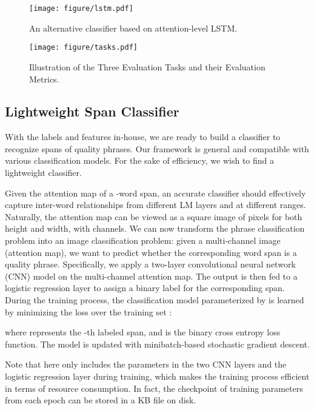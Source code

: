 \documentclass[sigconf]{acmart}
\begin{document}
\begin{figure}[t]
    \centering
    \texttt{[image: figure/lstm.pdf]}
    \caption{An alternative classifier based on attention-level LSTM.}
    \label{fig:lstm}
\end{figure}

\begin{figure*}[t]
    \centering
    \texttt{[image: figure/tasks.pdf]}
    \caption{
    Illustration of the Three Evaluation Tasks and their Evaluation Metrics.
    }\label{fig:tasks}\vspace{-3mm}
\end{figure*}


\subsection{Lightweight Span Classifier}
\label{sec:classifier}

With the labels and features in-house, we are ready to build a classifier to recognize spans of quality phrases. 
Our framework is general and 
compatible with various classification models.
For the sake of efficiency, we wish to find a lightweight classifier. 

Given the attention map of a -word span, an accurate classifier should effectively capture inter-word relationships from different LM layers and at different ranges.
Naturally, the attention map can be viewed as a square image of  pixels for both height and width, with  channels.
We can now transform the phrase classification problem into an image classification problem: given a multi-channel image (attention map), we want to predict whether the corresponding word span is a quality phrase.
Specifically, we apply a two-layer convolutional neural network (CNN) model on the multi-channel attention map.
The output is then fed to a logistic regression layer to assign a binary label for the corresponding span. 
During the training process, the classification model  parameterized by  is learned by minimizing the loss over the training set :


where  represents the -th labeled span, and  is the binary cross entropy loss function.
The model is updated with minibatch-based stochastic gradient descent.


Note that  here only includes the parameters in the two CNN layers and the logistic regression layer during training, which makes the training process efficient in terms of resource consumption.
In fact, the checkpoint of training parameters from each epoch can be stored in a  KB file on disk.
\end{document}

